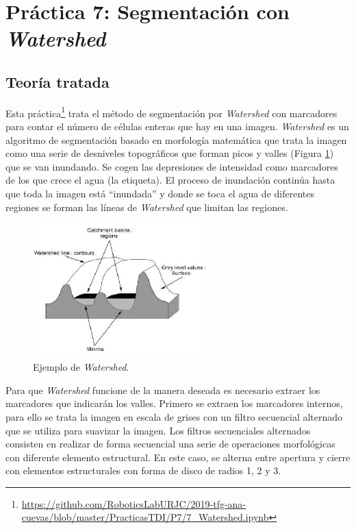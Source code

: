 \section{Práctica 7: Segmentación con \emph{Watershed}}
\subsection{Teoría tratada}

Esta práctica\footnote{\url{https://github.com/RoboticsLabURJC/2019-tfg-ana-cuevas/blob/master/PracticasTDI/P7/7_Watershed.ipynb}} trata el método de segmentación por \emph{Watershed} con marcadores para contar el número de células enteras que hay en una imagen.\emph{ Watershed} es un algoritmo de segmentación basado en morfología matemática que trata la imagen como una serie de desniveles topográficos que forman picos y valles (Figura \ref{watershed}) que se van inundando. Se cogen las depresiones de intensidad como marcadores de los que crece el agua (la etiqueta). El proceso de inundación continúa hasta que toda la imagen está ``inundada'' y donde se toca el agua de diferentes regiones se forman las líneas de  \emph{Watershed} que limitan las regiones.\\

\begin{figure}[h]
\centering
\includegraphics[width=0.6\textwidth]{imagenes/valles}
\caption{Ejemplo de \emph{Watershed}.}
\label{watershed} 
\end{figure}

Para que \emph{Watershed} funcione de la manera deseada es necesario extraer los marcadores que indicarán los valles. Primero se extraen los marcadores internos, para ello se trata la imagen en escala de grises con un filtro secuencial alternado que se utiliza para suavizar la imagen. Los filtros secuenciales alternados consisten en realizar de forma secuencial una serie de operaciones morfológicas con diferente elemento estructural. En este caso, se alterna entre apertura y cierre con elementos estructurales con forma de disco de radios 1, 2 y 3.\\

